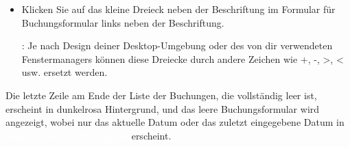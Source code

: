 \begin{itemize}
	\item Klicken Sie auf das kleine Dreieck neben der Beschriftung  im Formular für Buchungsformular links neben der Beschriftung.
	
	\Note{}: Je nach Design deiner Desktop-Umgebung oder des von dir verwendeten Fenstermanagers können diese Dreiecke durch andere Zeichen wie +, -, >, < usw. ersetzt werden.
\end{itemize}

Die letzte Zeile am Ende der Liste der Buchungen, die vollständig leer ist, erscheint in {\setlength{\fboxsep}{2pt}\colorbox[RGB]{245,155,155}{dunkelrosa Hintergrund}}, und das leere Buchungsformular wird angezeigt, wobei nur das aktuelle Datum oder das zuletzt eingegebene Datum in {\setlength{\fboxsep}{2pt}\colorbox[RGB]{61,174,233}{\textcolor{white}{\textsf{weiß auf blauem Hintergrund}}}} erscheint.


